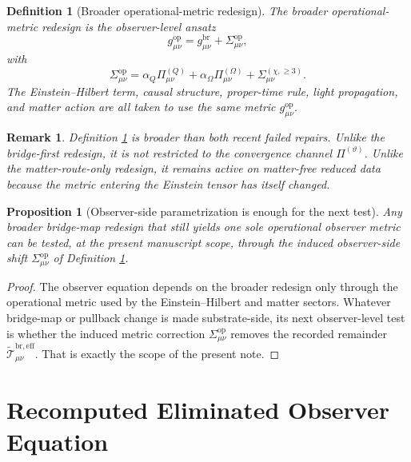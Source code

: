 \documentclass[11pt]{article}
\newcommand{\ReBridge}{g^{\mathrm{br}}}
\newcommand{\OpMetric}{g^{\mathrm{op}}}
\newcommand{\PiTheta}{\Pi^{(\vartheta)}}
\newcommand{\PiQ}{\Pi^{(Q)}}
\newcommand{\PiOmega}{\Pi^{(\Omega)}}
\newcommand{\SigmaOp}{\Sigma^{\mathrm{op}}}
\newcommand{\SigmaLong}{\Sigma^{(\chi,\ge 3)}}
\newcommand{\ReEff}{\widetilde{\mathcal T}_{\mu\nu}^{\mathrm{br,eff}}}
\newtheorem{definition}{Definition}
\newtheorem{proposition}{Proposition}
\newtheorem{remark}{Remark}
\begin{document}
\begin{definition}[Broader operational-metric redesign]
\label{def:opmetric}
The \emph{broader operational-metric redesign} is the observer-level ansatz
\begin{equation}
\OpMetric_{\mu\nu}
=
\ReBridge_{\mu\nu}
+\SigmaOp_{\mu\nu},
\label{eq:opmetric}
\end{equation}
with
\begin{equation}
\SigmaOp_{\mu\nu}
=
\alpha_Q\PiQ_{\mu\nu}
+\alpha_\Omega\PiOmega_{\mu\nu}
+\SigmaLong_{\mu\nu}.
\label{eq:sigmaop}
\end{equation}
The Einstein--Hilbert term, causal structure, proper-time rule, light propagation, and matter action are all taken to use the same metric \(\OpMetric_{\mu\nu}\).
\end{definition}

\begin{remark}
Definition \ref{def:opmetric} is broader than both recent failed repairs. Unlike the bridge-first redesign, it is not restricted to the convergence channel \(\PiTheta\). Unlike the matter-route-only redesign, it remains active on matter-free reduced data because the metric entering the Einstein tensor has itself changed.
\end{remark}

\begin{proposition}[Observer-side parametrization is enough for the next test]
\label{prop:param}
Any broader bridge-map redesign that still yields one sole operational observer metric can be tested, at the present manuscript scope, through the induced observer-side shift \(\SigmaOp_{\mu\nu}\) of Definition \ref{def:opmetric}.
\end{proposition}

\begin{proof}
The observer equation depends on the broader redesign only through the operational metric used by the Einstein--Hilbert and matter sectors. Whatever bridge-map or pullback change is made substrate-side, its next observer-level test is whether the induced metric correction \(\SigmaOp_{\mu\nu}\) removes the recorded remainder \(\ReEff\). That is exactly the scope of the present note.
\end{proof}

\section{Recomputed Eliminated Observer Equation}
\end{document}
